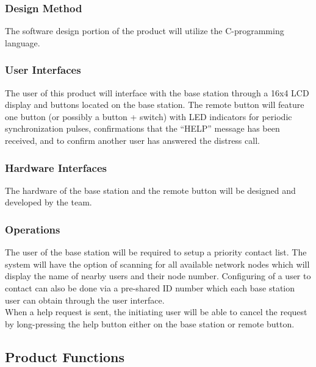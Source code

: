 \documentclass[journal,compsoc]{IEEEtran}
\begin{document}
\subsubsection{Design Method}
The software design portion of the product will utilize the C-programming language.

\subsubsection{User Interfaces}
The user of this product will interface with the base station through a 16x4 LCD display and buttons located on the base station.  The remote button will feature one button (or possibly a button + switch) with LED indicators for periodic synchronization pulses, confirmations that the “HELP” message has been received, and to confirm another user has answered the distress call.

\subsubsection{Hardware Interfaces}
The hardware of the base station and the remote button will be designed and developed by the team.

\subsubsection{Operations}
The user of the base station will be required to setup a priority contact list.  The system will have the option of scanning for all available network nodes which will display the name of nearby users and their node number.  Configuring of a user to contact can also be done via a pre-shared ID number which each base station user can obtain through the user interface.\\

\noindent When a help request is sent, the initiating user will be able to cancel the request by long-pressing the help button either on the base station or remote button.

\subsection{Product Functions}
\end{document}
